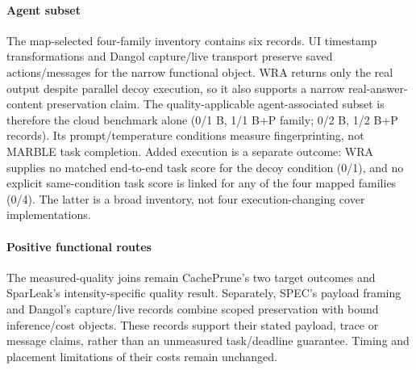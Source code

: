 \paragraph{Agent subset} The map-selected four-family inventory contains six records. UI timestamp transformations and Dangol capture/live transport preserve saved actions/messages for the narrow functional object. WRA returns only the real output despite parallel decoy execution, so it also supports a narrow real-answer-content preservation claim. The quality-applicable agent-associated subset is therefore the cloud benchmark alone (0/1 B, 1/1 B+P family; 0/2 B, 1/2 B+P records). Its prompt/temperature conditions measure fingerprinting, not MARBLE task completion. Added execution is a separate outcome: WRA supplies no matched end-to-end task score for the decoy condition (0/1), and no explicit same-condition task score is linked for any of the four mapped families (0/4). The latter is a broad inventory, not four execution-changing cover implementations.

\paragraph{Positive functional routes} The measured-quality joins remain CachePrune's two target outcomes and SparLeak's intensity-specific quality result. Separately, SPEC's payload framing and Dangol's capture/live records combine scoped preservation with bound inference/cost objects. These records support their stated payload, trace or message claims, rather than an unmeasured task/deadline guarantee. Timing and placement limitations of their costs remain unchanged.



